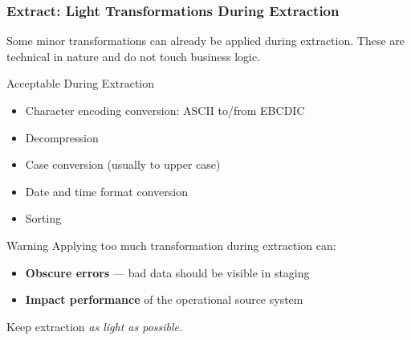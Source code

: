 \begin{frame}
  \frametitle{Extract: Light Transformations During Extraction}

  Some minor transformations can already be applied during extraction.
  These are technical in nature and do not touch business logic.

  \begin{block}{Acceptable During Extraction}
    \begin{itemize}
      \item Character encoding conversion: ASCII to/from EBCDIC
      \item Decompression
      \item Case conversion (usually to upper case)
      \item Date and time format conversion
      \item Sorting
    \end{itemize}
  \end{block}

  \begin{alertblock}{Warning}
    Applying too much transformation during extraction can:
    \begin{itemize}
      \item \textbf{Obscure errors} --- bad data should be visible in staging
      \item \textbf{Impact performance} of the operational source system
    \end{itemize}
    Keep extraction \textit{as light as possible}.
  \end{alertblock}
\end{frame}


